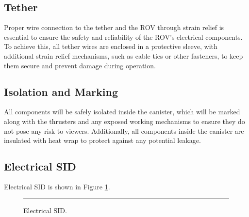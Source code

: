 \documentclass[11pt, twocolumn]{article}
\begin{document}
\subsection{Tether}

Proper wire connection to the tether and the ROV through strain relief is essential to ensure the safety and reliability of the ROV’s electrical components. To achieve this, all tether wires are enclosed in a protective sleeve, with additional strain relief mechanisms, such as cable ties or other fasteners, to keep them secure and prevent damage during operation.

\subsection{Isolation and Marking}

All components will be safely isolated inside the canister, which will be marked along with the thrusters and any exposed working mechanisms to ensure they do not pose any risk to viewers. Additionally, all components inside the canister are insulated with heat wrap to protect against any potential leakage.

\subsection{Electrical SID}

Electrical SID is shown in Figure \ref{fig:electrical_sid}.

\begin{figure}[h!]
    \centering
    \rule{\columnwidth}{\textheight-2cm}
    \caption{Electrical SID.}
    \label{fig:electrical_sid}
\end{figure}
\end{document}
